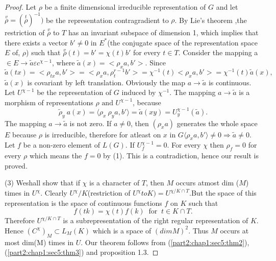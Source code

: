 \begin{proof}
 Let $\rho$ be a finite dimensional irreducible representation of $G$
 and let $\overset{v}\rho = (\overset{t}\rho)^{-1})$ be the
 representation contragradient to $\rho$. By Lie's theorem \cite{19},the
 restriction of $\overset{v}\rho$ to $T$ has an invariant subspace of
 dimension 1, which implies that there exists a vector $b' \neq 0$ in
 $E^*$(the conjugate space of the representation space $E$ of, $\rho$)
 such that $\overset{v}\rho(t)=b'= \chi(t)b'$ for every $t \in
 T$. Consider the mapping a $\in E \to \widetilde{a} \varepsilon c^{\chi -1}$,
 where $ \widetilde{a}(x)=  < \rho_x a, b'>$. Since  
 $$
 \widetilde{a}(tx)= < \rho_{tx}a,b'> = < \rho_xa,  \rho^{r-1}_t  b'>
 =\chi^{-1}(t) < \rho_x a,b'> = \chi^{-1}(t) \widetilde{a}(x), 
 $$
 $\widetilde{a}(x)$ is covariant by left translation. Obviously the map
 $a \to \widetilde{a}$ is continuous. Let $U^{\chi-1}$ be the
 representation of $G$ induced by $\chi^{-1}$. The mapping $a \to
 \widetilde{a}$ is a morphism of representations $\rho \text{ and }
 U^{\chi-1}$, because 
 $$
 \widetilde{\rho}_y ~a(x) = \langle \rho_x ~\rho_y a, b' \rangle =
 \widetilde{a}(xy)= U^{\chi-1}_y(\widetilde{a}). 
 $$
 The mapping $a \to \tilde{a}$ is not zero. If $a \neq 0$, then
 $(\rho_x a)$ generates the 
 whole space $E$ because $\rho$ is irreducible, therefore for atleast
 on $x$ in $G \langle \rho_x a, b' \rangle \neq 0 \Rightarrow
 \widetilde{a} \neq 0$. Let $f$ be a non-zero element of
 $L(G)$. If $U^{\chi-1}_f = 0$. For every $\chi$ then $\rho_f = 0$ for
 every $\rho$ which means the $f=0$ by (1). This is a contradiction,
 hence our result is proved. 
 
 (3) We\pageoriginale shall show that if $\chi$ is a character of $T$, then $M$
 occurs atmost dim ($M$) times in $U^{\chi}$. Clearly
 $U^{\chi}/K$(restriction of $U^{\chi}to K)=U^{\chi / K \cap T}$.But
 the space of this representation is the space of continuous functions
 $f$ on $K$ such that  
 $$
 f(t k) = \chi (t)f(k) ~\text{ for }~ t \in K \cap T.
 $$
 Therefore $U^{\chi / K \cap T}$ is a subrepresentation of the right
 regular representation of $K$. Hence $(C^{\chi})_M \subset L_M(K)$ which
 is a space of $(dim M)^2$. Thus $M$ occurs at most dim(M) times in
 $U$. Our theorem follows from (\ref{part2:chap1:sec5:thm2}),
 (\ref{part2:chap1:sec5:thm3}) and proposition 1.3. 
\end{proof}
